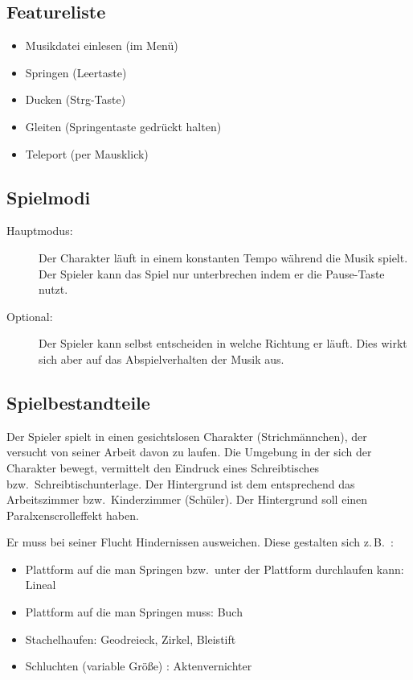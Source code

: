 \documentclass[Skript.tex]{subfiles}
\begin{document}
\subsection{Featureliste}

\begin{itemize}
\item Musikdatei einlesen (im Menü)
\item Springen (Leertaste)
\item Ducken  (Strg-Taste)
\item Gleiten (Springentaste gedrückt halten)
\item Teleport (per Mausklick)
\end{itemize}

\subsection{Spielmodi}

\begin{description}
\item[Hauptmodus:] Der Charakter läuft in einem konstanten Tempo während die Musik spielt. 
Der Spieler kann das Spiel nur unterbrechen indem er die Pause-Taste nutzt.
\item[Optional:] Der Spieler kann selbst entscheiden in welche Richtung er läuft. 
Dies wirkt sich aber auf das Abspielverhalten der Musik aus.
\end{description}


\subsection{Spielbestandteile}

Der Spieler spielt  in \gname einen gesichtslosen Charakter (Strichmännchen), der versucht von seiner Arbeit davon zu laufen. 
Die Umgebung in der sich der Charakter bewegt, vermittelt den Eindruck eines Schreibtisches bzw.\ Schreibtischunterlage. 
Der Hintergrund ist dem entsprechend das Arbeitszimmer bzw.\ Kinderzimmer (Schüler). 
Der Hintergrund soll einen Paralxenscrolleffekt haben.


Er muss bei seiner Flucht Hindernissen ausweichen. Diese gestalten sich z.\,B.\ :

\begin{itemize}
\item Plattform auf die man Springen bzw.\ unter der Plattform durchlaufen kann: Lineal
\item Plattform auf die man Springen muss: Buch
\item Stachelhaufen: Geodreieck, Zirkel, Bleistift
\item Schluchten (variable Größe) : Aktenvernichter
\end{itemize}
\end{document}
